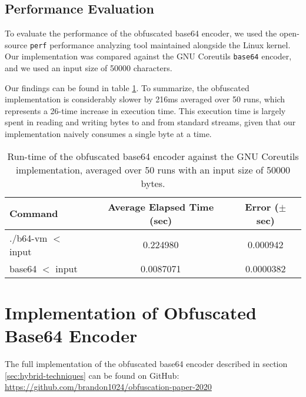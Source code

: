 \documentclass[conference]{IEEEtran}
\begin{document}
\subsection{Performance Evaluation}
\label{sec:vm-performance-evaluation}
To evaluate the performance of the obfuscated base64 encoder, we used the open-source \texttt{perf} performance analyzing tool maintained alongside the Linux kernel. Our implementation was compared against the GNU Coreutils \texttt{base64} encoder, and we used an input size of 50000 characters.

Our findings can be found in table \ref{tab:performance-numbers}. To summarize, the obfuscated implementation is considerably slower by 216ms averaged over 50 runs, which represents a 26-time increase in execution time. This execution time is largely spent in reading and writing bytes to and from standard streams, given that our implementation naively consumes a single byte at a time.

\begin{table}[h]
    \small
    \centering
    \caption{Run-time of the obfuscated base64 encoder against the GNU Coreutils implementation, averaged over 50 runs with an input size of 50000 bytes.}
    \begin{tabular}{||l c c||}
        \hline
        Command & Average Elapsed Time (sec) & Error ($\pm$ sec) \\ \hline
        ./b64-vm $<$ input & 0.224980 & 0.000942 \\ \hline
        base64 $<$ input & 0.0087071 & 0.0000382 \\ \hline
    \end{tabular}
    \label{tab:performance-numbers}
\end{table}

\appendices
\section{Implementation of Obfuscated Base64 Encoder}
\label{adx:impl-gh}
The full implementation of the obfuscated base64 encoder described in section \ref{sec:hybrid-techniques} can be found on GitHub: \url{https://github.com/brandon1024/obfuscation-paper-2020}
\end{document}
